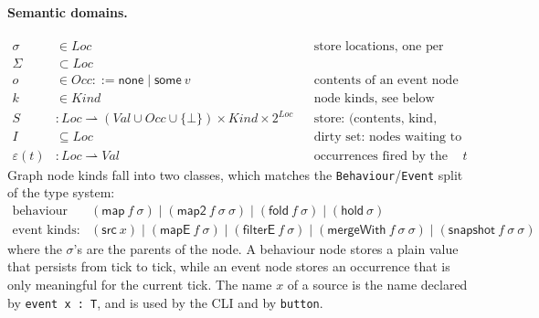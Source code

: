 \documentclass{article}
\newcommand{\kw}[1]{\mathsf{#1}}
\newcommand{\none}{\kw{none}}
\newcommand{\some}[1]{\kw{some}\ #1}
\begin{document}
\paragraph{Semantic domains.}
\begin{align*}
\sigma &\in \mathit{Loc} && \text{store locations, one per node of the graph}\\
  \Sigma & \subset \mathit{Loc} &&\\
o &\in \mathit{Occ} ::= \none \mid \some{v} && \text{contents of an event node}\\
k &\in \mathit{Kind} && \text{node kinds, see below}\\
S &: \mathit{Loc} \rightharpoonup (\mathit{Val} \cup \mathit{Occ} \cup \{\bot\}) \times \mathit{Kind} \times 2^{\mathit{Loc}} && \text{store: (contents, kind, dependents)}\\
I &\subseteq \mathit{Loc} && \text{dirty set: nodes waiting to be recomputed}\\
\varepsilon(t) &: \mathit{Loc} \rightharpoonup \mathit{Val} && \text{occurrences fired by the environment at tick } t
\end{align*}
Graph node kinds fall into two classes, which matches the \texttt{Behaviour}/\texttt{Event} split of the type system:
\begin{align*}
\text{behaviour kinds:}\quad & (\kw{map}\ f\ \sigma) \mid (\kw{map2}\ f\ \sigma\ \sigma) \mid (\kw{fold}\ f\ \sigma) \mid (\kw{hold}\ \sigma)\\
\text{event kinds:}\quad & (\kw{src}\ x) \mid (\kw{mapE}\ f\ \sigma) \mid (\kw{filterE}\ f\ \sigma) \mid (\kw{mergeWith}\ f\ \sigma\ \sigma) \mid (\kw{snapshot}\ f\ \sigma\ \sigma)
\end{align*}
where the $\sigma$'s are the parents of the node. A behaviour node stores a plain value that persists from tick to tick, while an event node stores an occurrence that is only meaningful for the current tick. The name $x$ of a source is the name declared by \texttt{event x : T}, and is used by the CLI and by \texttt{button}.
\end{document}
